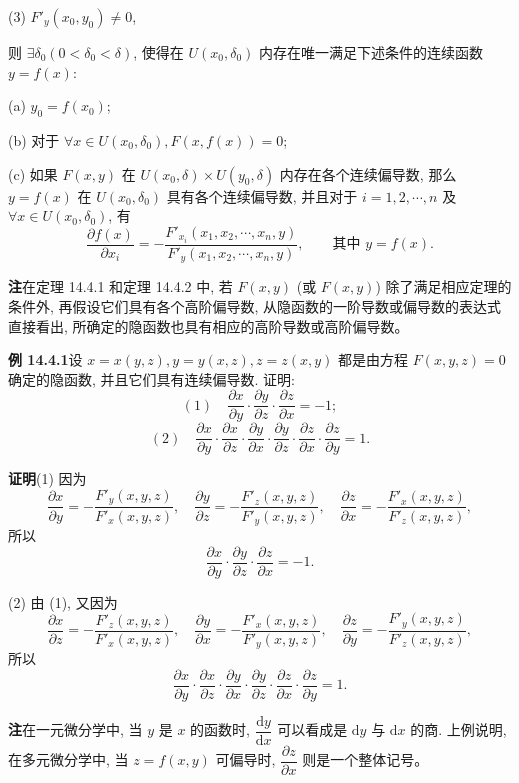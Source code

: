 \documentclass[UTF8,12pt,a4paper,fontset=fandol]{ctexart}
\begin{document}
(3) $F'_y(x_0,y_0)\ne0$,

则 $\exists\delta_0(0<\delta_0<\delta)$, 使得在 $U(x_0,\delta_0)$ 内存在唯一满足下述条件的连续函数 $y=f(x)$:

(a) $y_0=f(x_0)$;

(b) 对于 $\forall x\in U(x_0,\delta_0),F(x,f(x))=0$;

(c) 如果 $F(x,y)$ 在 $U(x_0,\delta)\times U(y_0,\delta)$ 内存在各个连续偏导数, 那么 $y=f(x)$ 在 $U(x_0,\delta_0)$ 具有各个连续偏导数, 并且对于 $i=1,2,\cdots,n$ 及 $\forall x\in U(x_0,\delta_0)$, 有
\[
  \frac{\partial f(x)}{\partial x_i}
  =-\frac{F'_{x_i}(x_1,x_2,\cdots,x_n,y)}
  {F'_y(x_1,x_2,\cdots,x_n,y)},\qquad
  \text{其中 }y=f(x).
\]

\noindent\textbf{注}\quad 在定理 14.4.1 和定理 14.4.2 中, 若 $F(x,y)$ (或 $F(x,y)$) 除了满足相应定理的条件外, 再假设它们具有各个高阶偏导数, 从隐函数的一阶导数或偏导数的表达式直接看出, 所确定的隐函数也具有相应的高阶导数或高阶偏导数。

\noindent\textbf{例 14.4.1}\quad 设 $x=x(y,z),y=y(x,z),z=z(x,y)$ 都是由方程 $F(x,y,z)=0$ 确定的隐函数, 并且它们具有连续偏导数. 证明:
\[
  (1)\quad \frac{\partial x}{\partial y}\cdot
  \frac{\partial y}{\partial z}\cdot
  \frac{\partial z}{\partial x}=-1;
\]
\[
  (2)\quad \frac{\partial x}{\partial y}\cdot
  \frac{\partial x}{\partial z}\cdot
  \frac{\partial y}{\partial x}\cdot
  \frac{\partial y}{\partial z}\cdot
  \frac{\partial z}{\partial x}\cdot
  \frac{\partial z}{\partial y}=1.
\]

\noindent\textbf{证明}\quad (1) 因为
\[
  \frac{\partial x}{\partial y}=-\frac{F'_y(x,y,z)}{F'_x(x,y,z)},\quad
  \frac{\partial y}{\partial z}=-\frac{F'_z(x,y,z)}{F'_y(x,y,z)},\quad
  \frac{\partial z}{\partial x}=-\frac{F'_x(x,y,z)}{F'_z(x,y,z)},
\]
所以
\[
  \frac{\partial x}{\partial y}\cdot
  \frac{\partial y}{\partial z}\cdot
  \frac{\partial z}{\partial x}=-1.
\]

(2) 由 (1), 又因为
\[
  \frac{\partial x}{\partial z}=-\frac{F'_z(x,y,z)}{F'_x(x,y,z)},\quad
  \frac{\partial y}{\partial x}=-\frac{F'_x(x,y,z)}{F'_y(x,y,z)},\quad
  \frac{\partial z}{\partial y}=-\frac{F'_y(x,y,z)}{F'_z(x,y,z)},
\]
所以
\[
  \frac{\partial x}{\partial y}\cdot
  \frac{\partial x}{\partial z}\cdot
  \frac{\partial y}{\partial x}\cdot
  \frac{\partial y}{\partial z}\cdot
  \frac{\partial z}{\partial x}\cdot
  \frac{\partial z}{\partial y}=1.
\]

\noindent\textbf{注}\quad 在一元微分学中, 当 $y$ 是 $x$ 的函数时, $\dfrac{\mathrm dy}{\mathrm dx}$ 可以看成是 $\mathrm dy$ 与 $\mathrm dx$ 的商. 上例说明, 在多元微分学中, 当 $z=f(x,y)$ 可偏导时, $\dfrac{\partial z}{\partial x}$ 则是一个整体记号。
\end{document}
